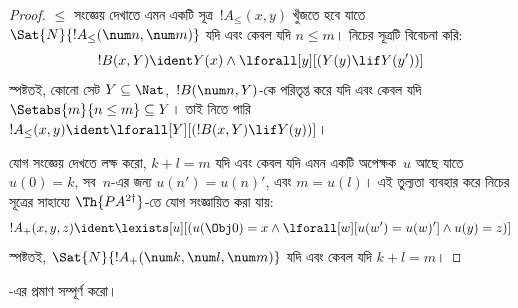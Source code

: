 \documentclass[../../../include/open-logic-section]{subfiles}
\begin{document}
\begin{proof}
$\le$ সংজ্ঞেয় দেখাতে এমন একটি সূত্র~$!A_\le(x, y)$ খুঁজতে হবে যাতে
$\Sat{N}{!A_\le(\num n, \num m)}$ যদি এবং কেবল যদি $n \le m$। নিচের
সূত্রটি বিবেচনা করি:
\[
!B(x, Y) \ident Y(x) \land \lforall[y][(Y(y) \lif Y(y'))]
\]
স্পষ্টতই, কোনো সেট $Y \subseteq \Nat$,~$!B(\num n, Y)$-কে পরিতৃপ্ত
করে যদি এবং কেবল যদি $\Setabs{m}{n \le m} \subseteq Y$। তাই নিতে
পারি $!A_\le(x, y) \ident
\lforall[Y][(!B(x, Y) \lif Y(y))]$।

যোগ সংজ্ঞেয় দেখতে লক্ষ করো, $k+l=m$ যদি এবং কেবল যদি এমন একটি
অপেক্ষক~$u$ আছে যাতে $u(0)=k$, সব~$n$-এর জন্য $u(n')=u(n)'$, এবং $m =
u(l)$। এই তুল্যতা ব্যবহার করে নিচের সূত্রের সাহায্যে
$\Th{PA^{2\dagger}}$-তে যোগ সংজ্ঞায়িত করা যায়:
\[
!A_+(x,y,z) \ident \lexists[u][(u(\Obj 0)=x \land \lforall[w][u(w')=u
 (w)'] \land u(y)=z)]
\]
স্পষ্টতই, $\Sat{N}{!A_+(\num k, \num l, \num m)}$ যদি এবং কেবল যদি
$k+l=m$।
\end{proof}

\begin{prob}
-এর প্রমাণ সম্পূর্ণ করো।
\end{prob}
\end{document}
